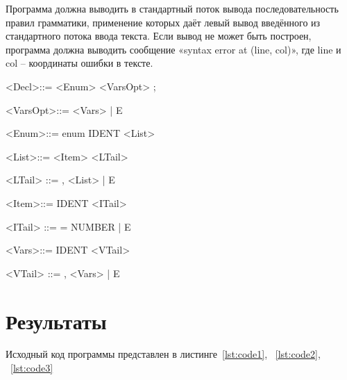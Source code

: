 \documentclass[a4paper, 14pt]{extarticle}
\begin{document}
    Программа должна выводить в стандартный поток вывода последовательность правил грамматики, применение которых даёт левый вывод введённого из стандартного потока ввода текста. Если вывод не может быть построен, программа должна выводить сообщение «syntax error at (line, col)», где line и col – координаты ошибки в тексте.

    <Decl>::= <Enum> <VarsOpt> ;
    
    <VarsOpt>::= <Vars> | E 
    
    <Enum>::= enum IDENT { <List> }
    
    <List>::= <Item> <LTail>
    
    <LTail> ::= , <List> | E
    
    <Item>::= IDENT <ITail>
    
    <ITail> ::= = NUMBER | E
    
    <Vars>::= IDENT <VTail>
    
    <VTail> ::= , <Vars> | E
    
\section{Результаты}\label{Sect::res}

Исходный код программы представлен в листинге~\ref{lst:code1}, ~\ref{lst:code2}, ~\ref{lst:code3}
\end{document}
